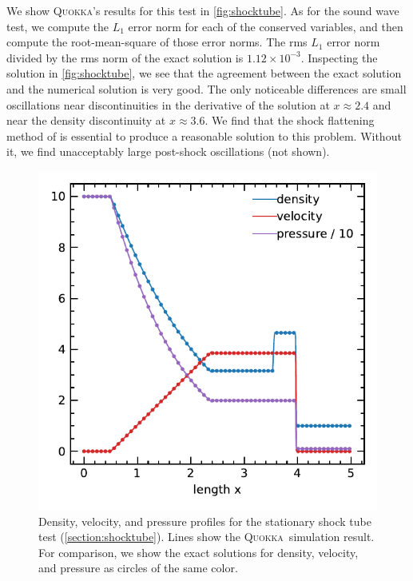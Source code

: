 \documentclass[fleqn,usenatbib]{mnras}
\newcommand{\quokka}{\textsc{Quokka}}
\begin{document}
We show \quokka's results for this test in \autoref{fig:shocktube}. As for the sound wave test, we compute the $L_1$ error norm for each of the conserved variables, and then compute the root-mean-square of those error norms. The rms $L_1$ error norm divided by the rms norm of the exact solution is $1.12 \times 10^{-3}$. Inspecting the solution in \autoref{fig:shocktube}, we see that the agreement between the exact solution and the numerical solution is very good. The only noticeable differences are small oscillations near discontinuities in the derivative of the solution at $x \approx 2.4$ and near the density discontinuity at $x \approx 3.6$. We find that the shock flattening method of \cite{Miller_2002} is essential to produce a reasonable solution to this problem. Without it, we find unacceptably large post-shock oscillations (not shown).
\begin{figure}
    \includegraphics[width=\columnwidth]{hydro_shocktube_0.4000.pdf}
    \caption{Density, velocity, and pressure profiles for the stationary shock tube test (\autoref{section:shocktube}). Lines show the \quokka~simulation result. For comparison, we show the exact solutions for density, velocity, and pressure as circles of the same color.}
    \label{fig:shocktube}
\end{figure}
\end{document}
